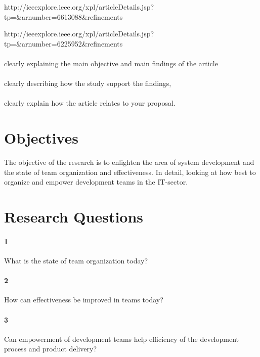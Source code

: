 \documentclass[12pt, a4paper]{article}
\begin{document}
http://ieeexplore.ieee.org/xpl/articleDetails.jsp?tp=&arnumber=6613088&refinements%

http://ieeexplore.ieee.org/xpl/articleDetails.jsp?tp=&arnumber=6225952&refinements%

\paragraph{}
clearly
explaining the main objective and main findings of the article

\paragraph{}
clearly
describing how the study support the findings, 

\paragraph{}
clearly explain how the
article relates to your proposal.


\section{Objectives}
The objective of the research is to enlighten the area of system development
and the state of team organization and effectiveness. In detail, looking at how
best to organize and empower development teams in the IT-sector. 

\section{Research Questions}


\paragraph{1}
What is the state of team organization today?

\paragraph{2}
How can effectiveness be improved in teams today? 

\paragraph{3}
Can empowerment of development teams help efficiency of the development process
and product delivery?
\end{document}
